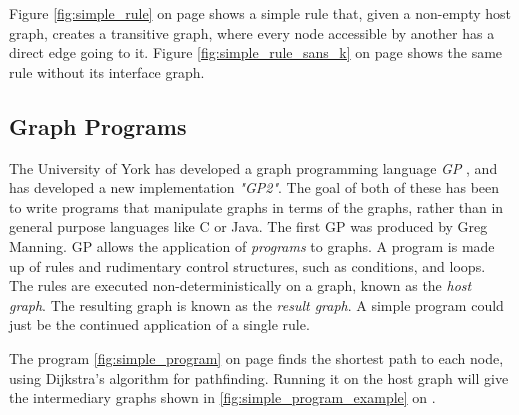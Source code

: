 \documentclass{UoYCSproject}
\begin{document}
Figure \ref{fig:simple_rule} on page \pageref{fig:simple_rule} shows a simple rule that, given a non-empty host graph, creates a transitive graph, where every node accessible by another has a direct edge going to it. Figure \ref{fig:simple_rule_sans_k} on page \pageref{fig:simple_rule_sans_k} shows the same rule without its interface graph.




\subsection{Graph Programs}
The University of York has developed a graph programming language \emph{GP} \cite{gp1}, and has developed a new implementation \emph{"GP2"}. The goal of both of these has been to write programs that manipulate graphs in terms of the graphs, rather than in general purpose languages like C or Java. The first GP was produced by Greg Manning. %
GP allows the application of \emph{programs} to graphs. A program is made up of rules and rudimentary control structures, such as conditions, and loops. The rules are executed non-deterministically on a graph, known as the \emph{host graph}. The resulting graph is known as the \emph{result graph}. A simple program could just be the continued application of a single rule.



The program \ref{fig:simple_program} on page \pageref{fig:simple_program} finds the shortest path to each node, using Dijkstra's algorithm for pathfinding. Running it on the host graph will give the intermediary graphs shown in \ref{fig:simple_program_example} on \pageref{fig:simple_program_example}.


\end{document}
